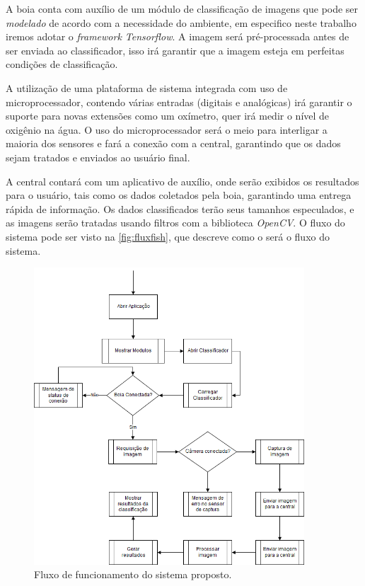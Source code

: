 
A boia conta com auxílio de um módulo de classificação  de imagens que pode ser \textit{modelado} de acordo com a necessidade do ambiente, em especifico neste trabalho iremos adotar o \textit{framework Tensorflow}. A imagem será pré-processada antes de ser enviada ao classificador, isso irá garantir que a imagem esteja em perfeitas condições de classificação.

A utilização de uma plataforma de sistema integrada com uso de microprocessador, contendo várias entradas (digitais e analógicas) irá garantir o suporte para novas extensões como um oxímetro, quer irá medir o nível de oxigênio na água. O uso do microprocessador será o meio para interligar a maioria dos sensores e fará a conexão com a central, garantindo que os dados sejam tratados e enviados ao usuário final.

A central contará com um aplicativo de auxílio, onde serão exibidos os resultados para o usuário, tais como os dados coletados pela boia, garantindo uma entrega rápida de informação. Os dados classificados terão seus tamanhos especulados, e as imagens serão tratadas usando filtros com a biblioteca \textit{OpenCV}. O fluxo do sistema pode ser visto na \autoref{fig:fluxfish}, que descreve como o será o fluxo do sistema.


\begin{figure}[ht]
	\caption{\label{fig:fluxfish}  Fluxo de funcionamento do sistema proposto.}
	 \begin{center}
		\includegraphics[width = 0.9\textwidth]			{resources/fluxogeral}
    \end{center}
\end{figure}

